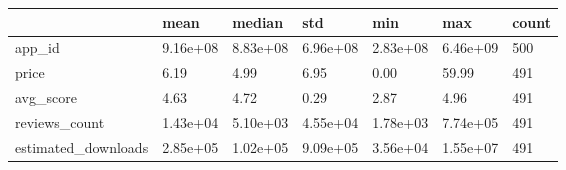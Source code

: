 \begin{tabular}{lllllll}
\toprule
 & mean & median & std & min & max & count \\
\midrule
app_id & 9.16e+08 & 8.83e+08 & 6.96e+08 & 2.83e+08 & 6.46e+09 & 500 \\
price & 6.19 & 4.99 & 6.95 & 0.00 & 59.99 & 491 \\
avg_score & 4.63 & 4.72 & 0.29 & 2.87 & 4.96 & 491 \\
reviews_count & 1.43e+04 & 5.10e+03 & 4.55e+04 & 1.78e+03 & 7.74e+05 & 491 \\
estimated_downloads & 2.85e+05 & 1.02e+05 & 9.09e+05 & 3.56e+04 & 1.55e+07 & 491 \\
\bottomrule
\end{tabular}

